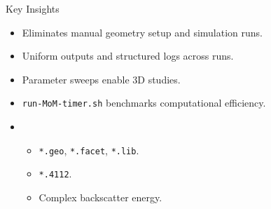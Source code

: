 %
%
%

\begin{frame}{Key Insights}
\begin{itemize}
    \item {} Eliminates manual geometry setup and simulation runs.
    \item {} Uniform outputs and structured logs across runs.
    \item {} Parameter sweeps enable 3D studies.
    \item {} \texttt{run-MoM-timer.sh} benchmarks computational efficiency.
    \item {}
    \begin{itemize}
        \item {} \texttt{*.geo}, \texttt{*.facet}, \texttt{*.lib}.
        \item {} \texttt{*.4112}.
        \item {} Complex backscatter energy.
    \end{itemize}
\end{itemize}
\end{frame}


\endinput  %
